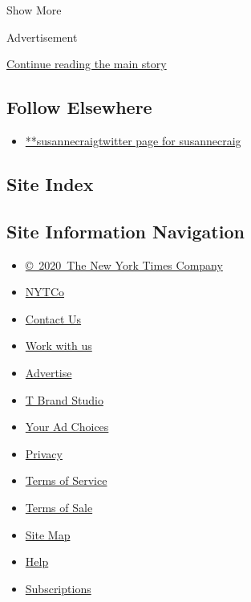 Show More

Advertisement

\protect\hyperlink{after-mid2}{Continue reading the main story}

\hypertarget{follow-elsewhere}{%
\subsection{Follow Elsewhere}\label{follow-elsewhere}}

\begin{itemize}
\tightlist
\item
  \href{https://twitter.com/susannecraig}{**susannecraigtwitter page for
  susannecraig}
\end{itemize}

\hypertarget{site-index}{%
\subsection{Site Index}\label{site-index}}

\hypertarget{site-information-navigation}{%
\subsection{Site Information
Navigation}\label{site-information-navigation}}

\begin{itemize}
\tightlist
\item
  \href{https://help.nytimes3xbfgragh.onion/hc/en-us/articles/115014792127-Copyright-notice}{©~2020~The
  New York Times Company}
\end{itemize}

\begin{itemize}
\tightlist
\item
  \href{https://www.nytco.com/}{NYTCo}
\item
  \href{https://help.nytimes3xbfgragh.onion/hc/en-us/articles/115015385887-Contact-Us}{Contact
  Us}
\item
  \href{https://www.nytco.com/careers/}{Work with us}
\item
  \href{https://nytmediakit.com/}{Advertise}
\item
  \href{http://www.tbrandstudio.com/}{T Brand Studio}
\item
  \href{https://www.nytimes3xbfgragh.onion/privacy/cookie-policy\#how-do-i-manage-trackers}{Your
  Ad Choices}
\item
  \href{https://www.nytimes3xbfgragh.onion/privacy}{Privacy}
\item
  \href{https://help.nytimes3xbfgragh.onion/hc/en-us/articles/115014893428-Terms-of-service}{Terms
  of Service}
\item
  \href{https://help.nytimes3xbfgragh.onion/hc/en-us/articles/115014893968-Terms-of-sale}{Terms
  of Sale}
\item
  \href{https://spiderbites.nytimes3xbfgragh.onion}{Site Map}
\item
  \href{https://help.nytimes3xbfgragh.onion/hc/en-us}{Help}
\item
  \href{https://www.nytimes3xbfgragh.onion/subscription?campaignId=37WXW}{Subscriptions}
\end{itemize}
